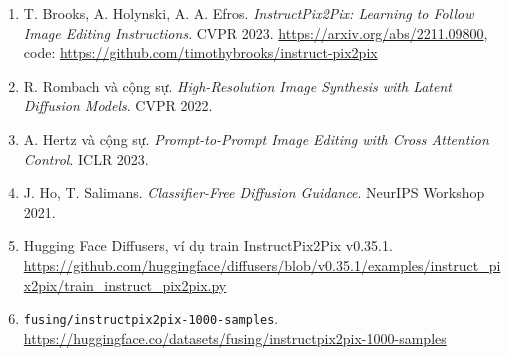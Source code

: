 \documentclass[12pt,a4paper]{article}
\begin{document}
\begin{enumerate}
\item[{[1]}] T. Brooks, A. Holynski, A. A. Efros. \emph{InstructPix2Pix: Learning to
Follow Image Editing Instructions}. CVPR 2023. \url{https://arxiv.org/abs/2211.09800},
code: \url{https://github.com/timothybrooks/instruct-pix2pix}
\item[{[2]}] R. Rombach và cộng sự. \emph{High-Resolution Image Synthesis with Latent
Diffusion Models}. CVPR 2022.
\item[{[3]}] A. Hertz và cộng sự. \emph{Prompt-to-Prompt Image Editing with Cross
Attention Control}. ICLR 2023.
\item[{[4]}] J. Ho, T. Salimans. \emph{Classifier-Free Diffusion Guidance}. NeurIPS
Workshop 2021.
\item[{[5]}] Hugging Face Diffusers, ví dụ train InstructPix2Pix v0.35.1.
\url{https://github.com/huggingface/diffusers/blob/v0.35.1/examples/instruct_pix2pix/train_instruct_pix2pix.py}
\item[{[6]}] \texttt{fusing/instructpix2pix-1000-samples}.
\url{https://huggingface.co/datasets/fusing/instructpix2pix-1000-samples}
\end{enumerate}
\end{document}
